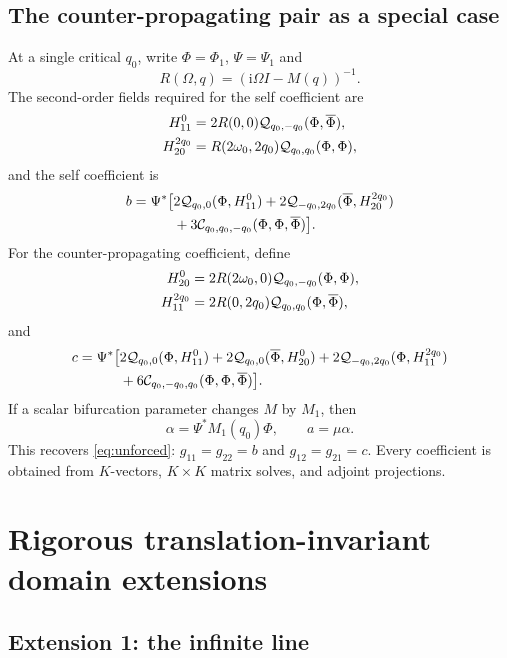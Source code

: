 \documentclass[11pt]{article}
\newcommand{\ii}{\mathrm{i}}
\newcommand{\cQ}{\mathcal Q}
\newcommand{\cC}{\mathcal C}
\begin{document}
\subsection{The counter-propagating pair as a special case}

At a single critical $q_0$, write $\Phi=\Phi_1$, $\Psi=\Psi_1$ and
\begin{equation}
 R(\Omega,q)=\left(\ii\Omega I-M(q)\right)^{-1}.
\end{equation}
The second-order fields required for the self coefficient are
\begin{align}
 H_{11}^0&=2R(0,0)\cQ_{q_0,-q_0}(\Phi,\overline\Phi),\notag\\
 H_{20}^{2q_0}&=R(2\omega_0,2q_0)\cQ_{q_0,q_0}(\Phi,\Phi),
\end{align}
and the self coefficient is
\begin{align}
 b=\Psi^*\big[&2\cQ_{q_0,0}(\Phi,H_{11}^0)
 +2\cQ_{-q_0,2q_0}(\overline\Phi,H_{20}^{2q_0})\notag\\
 &+3\cC_{q_0,q_0,-q_0}(\Phi,\Phi,\overline\Phi)\big].
 \label{eq:bformula}
\end{align}
For the counter-propagating coefficient, define
\begin{align}
 H_{20}^{0}&=2R(2\omega_0,0)\cQ_{q_0,-q_0}(\Phi,\Phi),\notag\\
 H_{11}^{2q_0}&=2R(0,2q_0)\cQ_{q_0,q_0}(\Phi,\overline\Phi),
\end{align}
and
\begin{align}
 c=\Psi^*\big[&2\cQ_{q_0,0}(\Phi,H_{11}^0)
 +2\cQ_{q_0,0}(\overline\Phi,H_{20}^{0})
 +2\cQ_{-q_0,2q_0}(\Phi,H_{11}^{2q_0})\notag\\
 &+6\cC_{q_0,-q_0,q_0}(\Phi,\Phi,\overline\Phi)\big].
 \label{eq:cformula}
\end{align}
If a scalar bifurcation parameter changes $M$ by $M_1$, then
\begin{equation}
 \alpha=\Psi^*M_1(q_0)\Phi,\qquad a=\mu\alpha.
 \label{eq:alphaformula}
\end{equation}
This recovers \eqref{eq:unforced}: $g_{11}=g_{22}=b$ and
$g_{12}=g_{21}=c$.  Every coefficient is obtained from $K$-vectors,
$K\times K$ matrix solves, and adjoint projections.

\section{Rigorous translation-invariant domain extensions}

\subsection{Extension 1: the infinite line}
\label{sec:nonperiodic}
\end{document}
